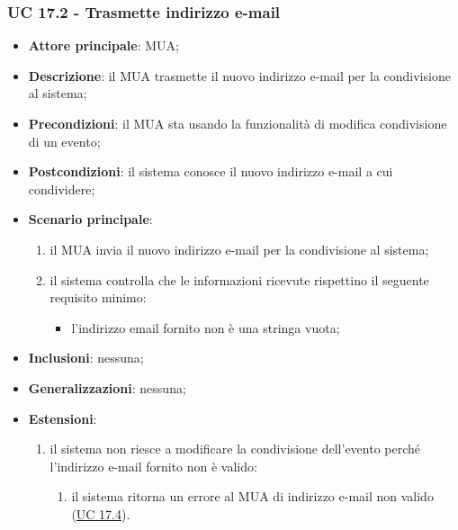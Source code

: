     \subsubsection{UC 17.2 - Trasmette indirizzo e-mail} \label{sec:UC17.2}
    \begin{itemize}
        \item \textbf{Attore principale}: MUA;
        \item \textbf{Descrizione}: il MUA trasmette il nuovo indirizzo e-mail per la condivisione al sistema;
        \item \textbf{Precondizioni}: il MUA sta usando la funzionalità di modifica condivisione di un evento;
        \item \textbf{Postcondizioni}: il sistema conosce il nuovo indirizzo e-mail a cui condividere;
        \item \textbf{Scenario principale}:
            \begin{enumerate}
                \item il MUA invia il nuovo indirizzo e-mail per la condivisione al sistema;
                \item il sistema controlla che le informazioni ricevute rispettino il seguente requisito minimo:
                    \begin{itemize}
                        \item l'indirizzo email fornito non è una stringa vuota;
                    \end{itemize}
            \end{enumerate}
        \item \textbf{Inclusioni}: nessuna;
        \item \textbf{Generalizzazioni}: nessuna;
        \item \textbf{Estensioni}:
            \begin{enumerate}[label=\alph*.]
                \item il sistema non riesce a modificare la condivisione dell'evento perché l'indirizzo e-mail fornito non è valido:
                \begin{enumerate}[label=\arabic*.]
                    \item il sistema ritorna un errore al MUA di indirizzo e-mail non valido (\hyperref[sec:UC17.4]{UC 17.4}).
                \end{enumerate}
            \end{enumerate}
    \end{itemize}


